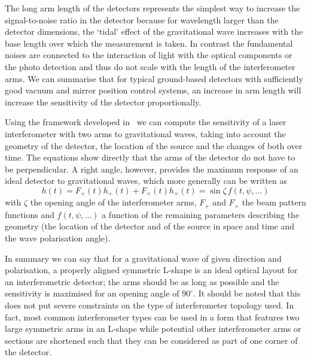 The long arm length of the detectors represents the simplest way to increase the signal-to-noise ratio
in the detector because for wavelength larger than the detector
dimensions, the `tidal' effect of the gravitational wave increases with the base length over which the
measurement is taken. In contrast the fundamental noises are connected to the interaction
of light with the optical components or the photo detection and thus do not scale with the length of the interferometer
arms.
We can summarise that for typical ground-based detectors with
sufficiently good vacuum and mirror position control systems, an increase in arm length will increase the
sensitivity of the detector proportionally.


Using the framework developed in~\cite{Jaranowski:1998qm} we can compute the sensitivity of a laser interferometer
with two arms to gravitational waves, taking into account the geometry of the detector, the location of the source and the
changes of both over time. The equations show directly that the arms of the detector do not
have to be perpendicular. A right angle, however, provides the maximum
response of an ideal detector to gravitational waves, which more generally can be written as
\begin{equation}
h(t)=F_{+}(t)h_{+}(t)+F_{\times}(t)h_{\times}(t)=\sin\zeta\,f(t,\psi, \dots)
\end{equation}
with $\zeta$ the opening angle of the interferometer arms, $F_{+}$ and $F_{\times}$ the beam pattern functions
and $f(t,\psi, \dots)$ a function of the remaining parameters describing the geometry (the location of the detector and
of the source in space and time and the wave polarisation angle).

In summary we can say that for a gravitational wave of given direction and polarisation, a properly aligned  symmetric L-shape
is an ideal optical layout for an interferometric
detector; the arms should be as long as possible and the sensitivity is maximised for an opening angle of $90^\circ$.
It should be noted that this does not put severe constraints on the type of interferometer topology used. In fact,
most common interferometer types can be used in a form that features two large symmetric arms in an L-shape
while potential other interferometer arms or sections are shortened such that they can be considered as part of one
corner of the detector.

